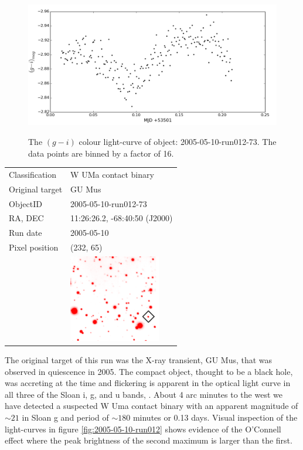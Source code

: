   \begin{figure}
    \center
    \includegraphics[width=120mm]{images/2005-05-10-run012-colourcurve-bin16.png} 
    \label{fig:2005-05-10-run012-colour}
    \caption{The $(g - i)$ colour light-curve of object: 2005-05-10-run012-73. The data points are binned by a factor of 16. }
  \end{figure}
  

  \begin{tabular}{l l}
  Classification & {W UMa} contact binary \\
  Original target & GU Mus \\
  ObjectID & 2005-05-10-run012-73 \\
  RA, DEC & 11:26:26.2, -68:40:50 (J2000) \\
  Run date & 2005-05-10 \\
  Pixel position & (232, 65) \\
   & \includegraphics[width=40mm]{images/2005-05-10-run012-73.png} \\
  \end{tabular}
  
The original target of this run was the X-ray transient, {GU Mus}, that was observed in quiescence in 2005. The compact object, thought to be a black hole, was accreting at the time and flickering is apparent in the optical light curve in all three of the Sloan i, g, and u bands, \citep{tariq2010}. About 4 arc minutes to the west we have detected a suspected {W Uma} contact binary with an apparent magnitude of $\sim21$ in Sloan g and period of $\sim 180$ minutes or 0.13 days. Visual inspection of the light-curves in figure \ref{fig:2005-05-10-run012} shows evidence of the O'Connell effect where the peak brightness of the second maximum is larger than the first. 

